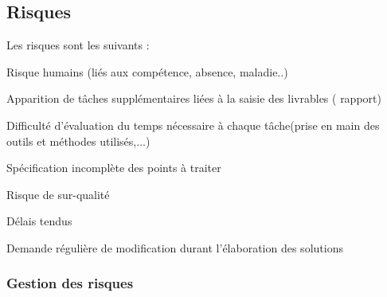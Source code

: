 \subsection{Risques}

\setcounter{risques}{0}

\newcommand{\risque}[1]{
    \addtocounter{risques}{1}
    \item[R\therisques]{\indent#1}
}
Les risques sont les suivants :
\begin{description}
    \risque{Risque humains (liés aux compétence, absence, maladie..)}
    \risque{Apparition de tâches supplémentaires liées à la saisie des livrables ( rapport)}
    \risque{Difficulté d’évaluation du temps nécessaire à chaque tâche(prise en main des outils et méthodes utilisés,...)}
    \risque{Spécification incomplète des points à traiter}
    \risque{Risque de sur-qualité}
    \risque{Délais tendus}
    \risque{Demande régulière de modification durant l’élaboration des solutions}
\end{description}

\subsubsection{Gestion des risques}

\setcounter{solutions}{0}

\newcommand{\solution}[1]{
    \addtocounter{solutions}{1}
    \item[S\thesolutions]{\indent#1}
}

